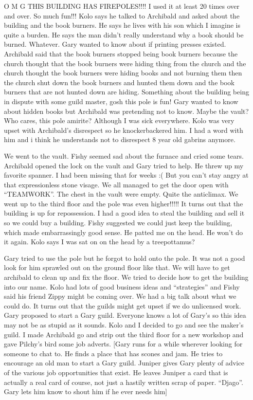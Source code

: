 O M G THIS BUILDING HAS FIREPOLES!!!! I used it at least 20 times over and over. So much fun!!! Kolo says he talked to Archibald and asked about the building and the book burners. He says he lives with his son which I imagine is quite a burden. He says the man didn’t really understand why a book should be burned. Whatever. Gary wanted to know about if printing presses existed. Archibald said that the book burners stopped being book burners because the church thought that the book burners were hiding thing from the church and the church thought the book burners were hiding books and not burning them then the church shut down the book burners and hunted them down and the book burners that are not hunted down are hiding. Something about the building being in dispute with some guild master, gosh this pole is fun! Gary wanted to know about hidden books but Archibald was pretending not to know. Maybe the vault? Who cares, this pole amirite? Although I was sick everywhere. Kolo was very upset with Archibald’s disrespect so he knockerbackered him. I had a word with him and i think he understands not to disrespect 8 year old gabrins anymore.\medskip

We went to the vault. Fishy seemed sad about the furnace and cried some tears. Archibald opened the lock on the vault and Gary tried to help. He threw up my favorite spanner. I had been missing that for weeks :( But you can’t stay angry at that expressionless stone visage. We all managed to get the door open with “TEAMWORK”. The chest in the vault were empty. Quite the anticlimax. We went up to the third floor and the pole was even higher!!!!! It turns out that the building is up for repossession. I had a good idea to steal the building and sell it so we could buy a building. Fishy suggested we could just keep the building, which made embarrassingly good sense. He patted me on the head. He won’t do it again. Kolo says I was sat on on the head by a treepottamus?\medskip

Gary tried to use the pole but he forgot to hold onto the pole. It was not a good look for him sprawled out on the ground floor like that. We will have to get archibald to clean up and fix the floor. We tried to decide how to get the building into our name. Kolo had lots of good business ideas and “strategies” and Fishy said his friend Zippy might be coming over. We had a big talk about what we could do. It turns out that the guilds might get upset if we do unlicensed work. Gary proposed to start a Gary guild. Everyone knows a lot of Gary’s so this idea may not be as stupid as it sounds. Kolo and I decided to go and see the maker’s guild. I made Archibald go and strip out the third floor for a new workshop and gave Pilchy’s bird some job adverts. [Gary runs for a while wherever looking for someone to chat to. He finds a place that has scones and jam. He tries to encourage an old man to start a Gary guild. Juniper gives Gary plenty of advice of the various job opportunities that exist. He leaves Juniper a card that is actually a real card of course, not just a hastily written scrap of paper. “Djago”. Gary lets him know to shout him if he ever needs him]\medskip

